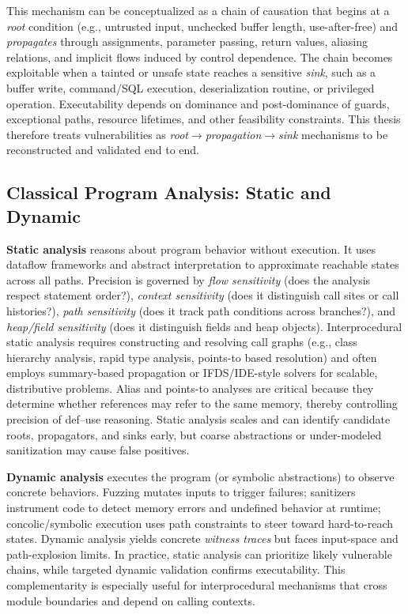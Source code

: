 \documentclass{buthesis}
\begin{document}
This mechanism can be conceptualized as a chain of causation that begins at a \emph{root} condition (e.g., untrusted input, unchecked buffer length, use-after-free) and \emph{propagates} through assignments, parameter passing, return values, aliasing relations, and implicit flows induced by control dependence. The chain becomes exploitable when a tainted or unsafe state reaches a sensitive \emph{sink}, such as a buffer write, command/SQL execution, deserialization routine, or privileged operation. Executability depends on dominance and post-dominance of guards, exceptional paths, resource lifetimes, and other feasibility constraints. This thesis therefore treats vulnerabilities as \emph{root$\rightarrow$propagation$\rightarrow$sink} mechanisms to be reconstructed and validated end to end.

\subsection{Classical Program Analysis: Static and Dynamic}
\label{sec:intro-classical}

\textbf{Static analysis} reasons about program behavior without execution. It uses dataflow frameworks and abstract interpretation to approximate reachable states across all paths. Precision is governed by \emph{flow sensitivity} (does the analysis respect statement order?), \emph{context sensitivity} (does it distinguish call sites or call histories?), \emph{path sensitivity} (does it track path conditions across branches?), and \emph{heap/field sensitivity} (does it distinguish fields and heap objects). Interprocedural static analysis requires constructing and resolving call graphs (e.g., class hierarchy analysis, rapid type analysis, points-to based resolution) and often employs summary-based propagation or IFDS/IDE-style solvers for scalable, distributive problems. Alias and points-to analyses are critical because they determine whether references may refer to the same memory, thereby controlling precision of def--use reasoning. Static analysis scales and can identify candidate roots, propagators, and sinks early, but coarse abstractions or under-modeled sanitization may cause false positives.

\textbf{Dynamic analysis} executes the program (or symbolic abstractions) to observe concrete behaviors. Fuzzing mutates inputs to trigger failures; sanitizers instrument code to detect memory errors and undefined behavior at runtime; concolic/symbolic execution uses path constraints to steer toward hard-to-reach states. Dynamic analysis yields concrete \emph{witness traces} but faces input-space and path-explosion limits. In practice, static analysis can prioritize likely vulnerable chains, while targeted dynamic validation confirms executability. This complementarity is especially useful for interprocedural mechanisms that cross module boundaries and depend on calling contexts.
\end{document}
